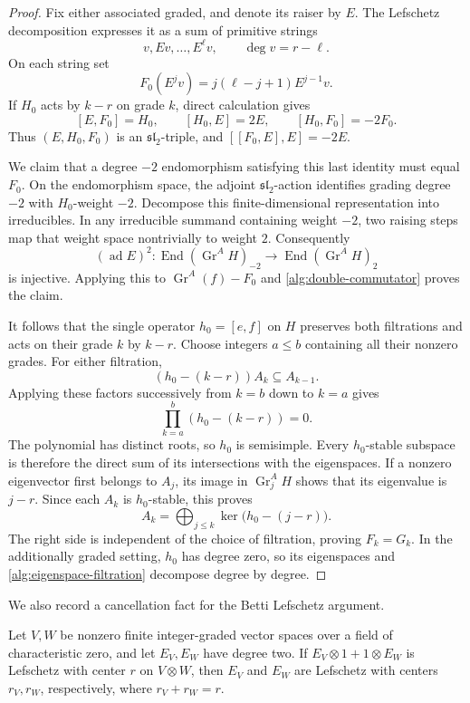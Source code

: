 \begin{proof}
Fix either associated graded, and denote its raiser by $E$.
The Lefschetz decomposition expresses it as a sum of primitive strings
\[
 v,Ev,\ldots,E^\ell v,\qquad \deg v=r-\ell.
\]
On each string set
\[
 F_0(E^jv)=j(\ell-j+1)E^{j-1}v.
\]
If $H_0$ acts by $k-r$ on grade $k$, direct calculation gives
\[
 [E,F_0]=H_0,\qquad [H_0,E]=2E,\qquad [H_0,F_0]=-2F_0.
\]
Thus $(E,H_0,F_0)$ is an $\mathfrak{sl}_2$-triple, and
$[[F_0,E],E]=-2E$.

We claim that a degree $-2$ endomorphism satisfying this last identity
must equal $F_0$.  On the endomorphism space, the adjoint
$\mathfrak{sl}_2$-action identifies grading degree $-2$ with
$H_0$-weight $-2$.  Decompose this finite-dimensional representation
into irreducibles.  In any irreducible summand containing weight $-2$,
two raising steps map that weight space nontrivially to weight $2$.
Consequently
\[
 (\operatorname{ad}E)^2:
 \operatorname{End}(\operatorname{Gr}^A H)_{-2}
 \longrightarrow
 \operatorname{End}(\operatorname{Gr}^A H)_{2}
\]
is injective.  Applying this to $\operatorname{Gr}^A(f)-F_0$ and
\eqref{alg:double-commutator} proves the claim.

It follows that the single operator $h_0=[e,f]$ on $H$ preserves both
filtrations and acts on their grade $k$ by $k-r$.  Choose integers
$a\le b$ containing all their nonzero grades.  For either filtration,
\[
 (h_0-(k-r))A_k\subseteq A_{k-1}.
\]
Applying these factors successively from $k=b$ down to $k=a$ gives
\[
 \prod_{k=a}^b(h_0-(k-r))=0.
\]
The polynomial has distinct roots, so $h_0$ is semisimple.
Every $h_0$-stable subspace is therefore the direct sum of its
intersections with the eigenspaces.
If a nonzero eigenvector first belongs to $A_j$, its image in
$\operatorname{Gr}^A_jH$ shows that its eigenvalue is $j-r$.
Since each $A_k$ is $h_0$-stable, this proves
\begin{equation}\label{alg:eigenspace-filtration}
 A_k=\bigoplus_{j\le k}\ker\bigl(h_0-(j-r)\bigr).
\end{equation}
The right side is independent of the choice of filtration, proving
$F_k=G_k$.  In the additionally graded setting, $h_0$ has degree zero,
so its eigenspaces and \eqref{alg:eigenspace-filtration} decompose
degree by degree.
\end{proof}

We also record a cancellation fact for the Betti Lefschetz argument.

\begin{lemma}\label{alg:tensor}
Let $V,W$ be nonzero finite integer-graded vector spaces over a field
of characteristic zero, and let $E_V,E_W$ have degree two.
If $E_V\otimes1+1\otimes E_W$ is Lefschetz with center $r$ on
$V\otimes W$, then $E_V$ and $E_W$ are Lefschetz with centers
$r_V,r_W$, respectively, where $r_V+r_W=r$.
\end{lemma}

